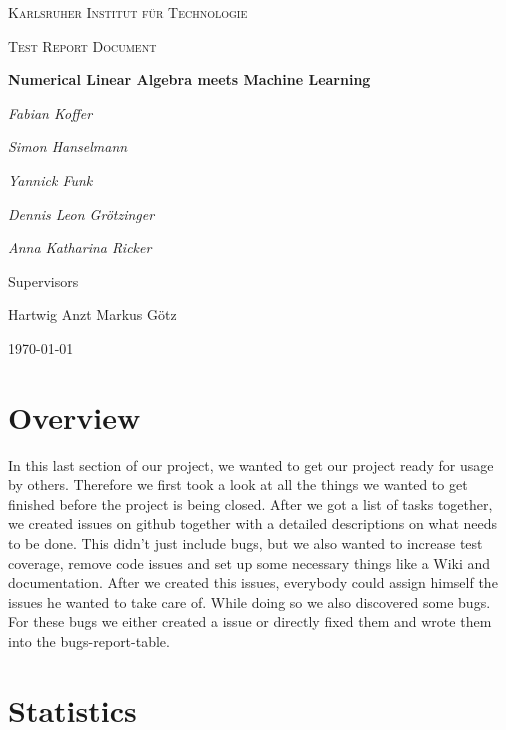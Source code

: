 \documentclass[parskip=full]{scrartcl}
\begin{document}
\begin{titlepage}
\centering
{\scshape\LARGE Karlsruher Institut für Technologie\par}
\vspace{1cm}
{\scshape\Large Test Report Document \par}
\vspace{1.5cm}
{\huge\bfseries Numerical Linear Algebra meets Machine Learning \par}
\vspace {2cm}

{\Large\itshape Fabian Koffer\par}
{\Large\itshape Simon Hanselmann\par}
{\Large\itshape Yannick Funk\par}
{\Large\itshape Dennis Leon Gr\"{o}tzinger\par}
{\Large\itshape Anna Katharina Ricker\par}

\vfill
Supervisors\par
Hartwig Anzt
Markus G\"{o}tz


\vfill
{\large\today\par}
\end{titlepage}

\tableofcontents
\newpage

\section{Overview}

In this last section of our project, we wanted to get our project ready for usage by others.
Therefore we first took a look at all the things we wanted to get finished before the project is being closed.
After we got a list of tasks together, we created issues on \gls{github} together with a detailed descriptions on what needs to be done.
This didn't just include bugs, but we also wanted to increase test coverage, remove code issues and set up some necessary things like a Wiki and documentation.
After we created this issues, everybody could assign himself the issues he wanted to take care of.
While doing so we also discovered some bugs.
For these bugs we either created a issue or directly fixed them and wrote them into the bugs-report-table.

\newpage

\section{Statistics}
\end{document}
